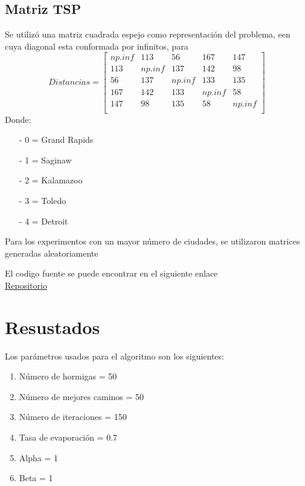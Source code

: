 \documentclass[]{report}
\begin{document}
	\subsection{Matriz TSP}
	Se utilizó una matriz cuadrada espejo como representación del problema, een cuya diagonal esta conformada por infinitos, para \\
	\[
	Distancias =
	\begin{bmatrix}
		np.inf&113&56&167&147\\
		113&np.inf&137&142&98\\
		56&137&np.inf&133&135\\
		167&142&133&np.inf&58\\
		147&98&135&58&np.inf\\
	\end{bmatrix}
	\]
	Donde:
	\begin{itemize}
		\item[-]0 = Grand Rapids
		\item[-]1 = Saginaw
		\item[-]2 = Kalamazoo
		\item[-]3 = Toledo
		\item[-]4 = Detroit
	\end{itemize}
	
	Para los experimentos con un mayor número de ciudades, se utilizaron matrices generadas aleatoriamente
	
	El codigo fuente se puede encontrar en el siguiente enlace\\
	\href{https://github.com/jhoel-choque/practica_1}{Repositorio}
	\section{Resustados}
	Los parámetros usados para el algoritmo son los siguientes:
	\begin{enumerate}
		\item Número de hormigas = 50
		\item Número de mejores caminos = 50
		\item Número de iteraciones = 150
		\item Tasa de evaporación = 0.7
		\item Alpha = 1
		\item Beta = 1
	\end{enumerate}
\end{document}
